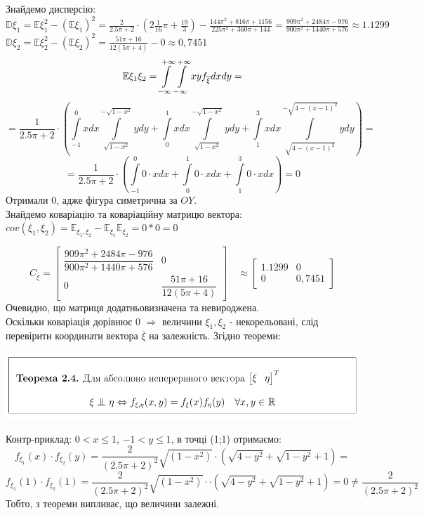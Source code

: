 \documentclass[14pt,a4paper]{scrartcl}
\theoremstyle{definition}
\theoremstyle{remark}
\theoremstyle{definition}
\theoremstyle{definition}
\begin{document}
Знайдемо дисперсію:\\
$
\mathbb{D}\xi_1 = \mathbb{E}\xi_1^2 - \left( \mathbb{E}\xi_1 \right)^2 = \frac{2}{2.5\pi + 2}\cdot \left(2\frac{1}{16}\pi + \frac{19}{3}\right)  -\frac{144 {{\ensuremath{\pi} }^{2}}+816 \ensuremath{\pi} +1156}{225 {{\ensuremath{\pi} }^{2}}+360 \ensuremath{\pi} +144} = \frac{909 {{\ensuremath{\pi} }^{2}}+2484 \ensuremath{\pi} -976}{900 {{\ensuremath{\pi} }^{2}}+1440 \ensuremath{\pi} +576} \approx 1.1299
$\\
$
\mathbb{D}\xi_2 = \mathbb{E}\xi_2^2 - \left( \mathbb{E}\xi_2 \right)^2 = \frac{51\pi + 16}{12(5\pi +4)} - 0 \approx 0,7451
$
$$
\mathbb{E} \xi_1 \xi_2 =  \int\limits_{-\infty}^{+\infty}\int\limits_{-\infty}^{+\infty}{ xy f_{\overline{\xi}} dxdy} =$$
$$=  \frac{1}{2.5\pi + 2}\cdot \left(
 \int\limits_{-1}^{0}{xdx  \int\limits_{\sqrt{1 - x^2}}^{ -\sqrt{1 - x^2}}{ydy}} +
 \int\limits_{0}^{1}{xdx  \int\limits_{\sqrt{1 - x^2}}^{ -\sqrt{1 - x^2}}{ydy}} +  \int\limits_{1}^{3}{xdx  \int\limits_{\sqrt{4 - (x-1)^2}}^{ -\sqrt{4 - (x-1)^2}}{ydy}}
 \right)  =
$$
$$
= \frac{1}{2.5\pi + 2}\cdot \left(
 \int\limits_{-1}^{0}{0 \cdot xdx  } +
 \int\limits_{0}^{1}{0 \cdot xdx  } +  \int\limits_{1}^{3}{0 \cdot xdx  }
 \right)  = 0
$$
Отримали 0, адже фігура симетрична за $OY$.\\
Знайдемо коваріацію та коваріаційну матрицю вектора:
$cov(\xi_1, \xi_2) = \mathbb{E}_{\xi_1, \xi_2} - \mathbb{E}_{\xi_1} \mathbb{E}_{\xi_2} = 0* 0 = 0$

$$
C_{\overline{\xi}} = \begin{bmatrix}
  \dfrac{909 {{\ensuremath{\pi} }^{2}}+2484 \ensuremath{\pi} -976}{900 {{\ensuremath{\pi} }^{2}}+1440 \ensuremath{\pi} +576} & 0\\
	0 &  \dfrac{51\pi + 16}{12(5\pi +4)}
\end{bmatrix} \quad \approx \begin{bmatrix}
  1.1299 & 0\\
 0 &  0,7451
\end{bmatrix}
$$
Очевидно, що матриця додатньовизначена та невироджена.\\
Оскільки коваріація дорівнює 0 $\Rightarrow$ величини $\xi_1, \xi_2$ - некорельовані, слід перевірити координати вектора $\overline{\xi}$ на залежність. Згідно теореми:
\begin{center} \includegraphics[scale=0.4]{assets/adf445345.png} \end{center}
Контр-приклад: $0 < x \leq 1$, $-1 < y \leq 1$, в точці (1;1) отримаємо:
$$
 f_{\xi_1}(x) \cdot  f_{\xi_2}(y) = \dfrac{2}{(2.5\pi + 2)^2} \sqrt{(1-x^2)}\cdot  \left( \sqrt{4 - y^2} + \sqrt{1-y^2}+ 1  \right)=
$$
$$
 f_{\xi_1}(1) \cdot  f_{\xi_2}(1) = \dfrac{2}{(2.5\pi + 2)^2} \sqrt{(1-x^2)}\cdot \cdot \left( \sqrt{4 - y^2} + \sqrt{1-y^2}+ 1  \right)= 0 \neq  \dfrac{2}{(2.5\pi + 2)^2}
$$
Тобто, з теореми випливає, що величини залежні.
\newpage
\end{document}
